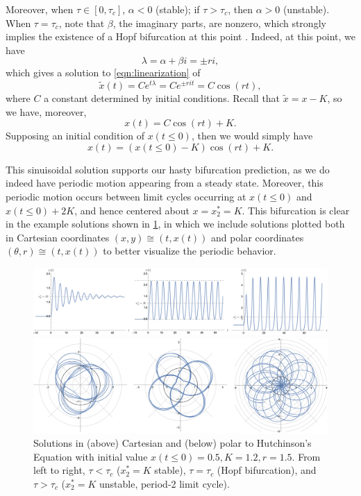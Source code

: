 \documentclass[12pt]{article}
\begin{document}
Moreover, when $\tau \in [0, \tau_c]$, $\alpha < 0$ (stable); if $\tau > \tau_c$, then $\alpha > 0$ (unstable). When $\tau = \tau_c$, note that $\beta$, the imaginary parts, are nonzero, which strongly implies the existence of a Hopf bifurcation at this point \cite{scientificcomputing}. Indeed, at this point, we have \[
\lambda = \alpha + \beta i = \pm r i,
\]
which gives a solution to \cref{eqn:linearization} of \begin{equation}
    \tilde{x}(t) = Ce^{t \lambda} = Ce^{\pm r i t} = C \cos (rt),
\end{equation}
where $C$ a constant determined by initial conditions. Recall that $\tilde{x} = x - K$, so we have, moreover, \begin{equation*}\label{eqn:solutionhopf}
    x(t) = C \cos (rt) + K.
\end{equation*}
Supposing an initial condition of $x(t \leq 0)$, then we would simply have \[
x(t) = (x(t \leq 0) - K) \cos (rt) + K.   
\]

This sinuisoidal solution supports our hasty bifurcation prediction, as we do indeed have periodic motion appearing from a steady state. Moreover, this periodic motion occurs between limit cycles occurring at $x(t \leq 0)$ and $x(t\leq 0) + 2K$, and hence centered about $x = x^*_2 = K$. This bifurcation is clear in the example solutions shown in \cref{fig:example2sol}, in which we include solutions plotted both in Cartesian coordinates $(x, y) \cong (t, x(t))$ and polar coordinates $(\theta, r) \cong (t, x(t))$ to better visualize the periodic behavior.

\begin{figure}[!ht]
    \centering
    \includegraphics*[width=1.01\linewidth]{figures/example2.png}
    \vspace{1.5em}
    \caption{Solutions in (above) Cartesian and (below) polar to Hutchinson's Equation with initial value $x(t \leq 0) = 0.5, K = 1.2, r = 1.5$. From left to right, $\tau < \tau_c$ ($x_2^* = K$ stable), $\tau = \tau_c$ (Hopf bifurcation), and $\tau > \tau_c$ ($x_2^* = K$ unstable, period-2 limit cycle). }
    \label{fig:example2sol}
    \vspace{2em}
    \includegraphics*[width=\linewidth]{figures/example2polar.png}
\end{figure}
\end{document}
